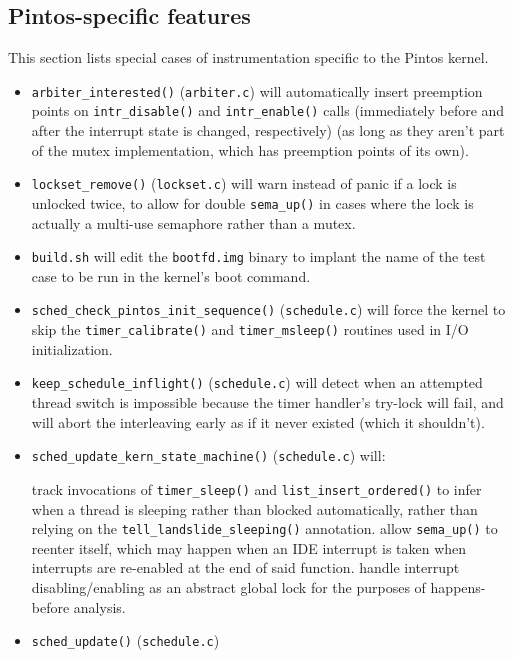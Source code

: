 \subsection{Pintos-specific features}
\label{sec:landslide-pintosspecifics}

This section lists special cases of instrumentation specific to the Pintos kernel.

\begin{itemize}
	\item {\tt arbiter\_interested()} ({\tt arbiter.c})
		will automatically insert preemption points on {\tt intr\_disable()} and {\tt intr\_enable()} calls
		(immediately before and after the interrupt state is changed, respectively)
		(as long as they aren't part of the mutex implementation, which has preemption points of its own).
	\item {\tt lockset\_remove()} ({\tt lockset.c})
		will warn instead of panic if a lock is unlocked twice,
		to allow for double {\tt sema\_up()} in cases where the lock is actually a multi-use semaphore rather than a mutex.
	\item {\tt build.sh} will edit the {\tt bootfd.img} binary to implant the name of the test case to be run in the kernel's boot command.
	\item {\tt sched\_check\_pintos\_init\_sequence()} ({\tt schedule.c})
		will force the kernel to skip the {\tt timer\_calibrate()} and {\tt timer\_msleep()} routines
		used in I/O initialization.
	\item {\tt keep\_schedule\_inflight()} ({\tt schedule.c})
		will detect when an attempted thread switch is impossible
		because the timer handler's try-lock will fail,
		and will abort the interleaving early as if it never existed (which it shouldn't).
	\item {\tt sched\_update\_kern\_state\_machine()} ({\tt schedule.c})
		will:
		\begin{itemize}
			\llitem track invocations of {\tt timer\_sleep()} and {\tt list\_insert\_ordered()}
				to infer when a thread is sleeping rather than blocked automatically,
				rather than relying on the {\tt tell\_landslide\_sleeping()} annotation.
			\llitem allow {\tt sema\_up()} to reenter itself,
				which may happen when an IDE interrupt is taken when interrupts are re-enabled at the end of said function.
			\llitem handle interrupt disabling/enabling as an abstract global lock for the purposes of happens-before analysis.
		\end{itemize}
	\item {\tt sched\_update()} ({\tt schedule.c})

\end{itemize}
